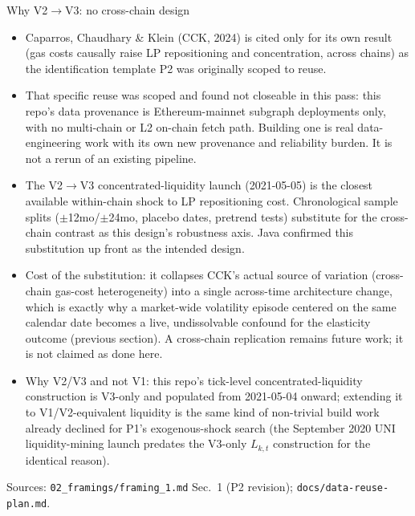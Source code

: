 \documentclass[aspectratio=169]{beamer}
\begin{document}
\begin{frame}{Why V2$\to$V3: no cross-chain design}
  \scriptsize
  \begin{itemize}
    \item Caparros, Chaudhary \& Klein (CCK, 2024) is cited only for its own result (gas costs causally raise LP repositioning and concentration, across chains) as the identification template P2 was originally scoped to reuse.
    \item That specific reuse was scoped and found not closeable in this pass: this repo's data provenance is Ethereum-mainnet subgraph deployments only, with no multi-chain or L2 on-chain fetch path. Building one is real data-engineering work with its own new provenance and reliability burden. It is not a rerun of an existing pipeline.
    \item The V2$\to$V3 concentrated-liquidity launch (2021-05-05) is the closest available within-chain shock to LP repositioning cost. Chronological sample splits ($\pm$12mo/$\pm$24mo, placebo dates, pretrend tests) substitute for the cross-chain contrast as this design's robustness axis. Java confirmed this substitution up front as the intended design.
    \item Cost of the substitution: it collapses CCK's actual source of variation (cross-chain gas-cost heterogeneity) into a single across-time architecture change, which is exactly why a market-wide volatility episode centered on the same calendar date becomes a live, undissolvable confound for the elasticity outcome (previous section). A cross-chain replication remains future work; it is not claimed as done here.
    \item Why V2/V3 and not V1: this repo's tick-level concentrated-liquidity construction is V3-only and populated from 2021-05-04 onward; extending it to V1/V2-equivalent liquidity is the same kind of non-trivial build work already declined for P1's exogenous-shock search (the September 2020 UNI liquidity-mining launch predates the V3-only $L_{k,t}$ construction for the identical reason).
  \end{itemize}
  {\scriptsize Sources: \texttt{02\_framings/framing\_1.md} Sec.\ 1 (P2 revision); \texttt{docs/data-reuse-plan.md}.}
\end{frame}
\end{document}
